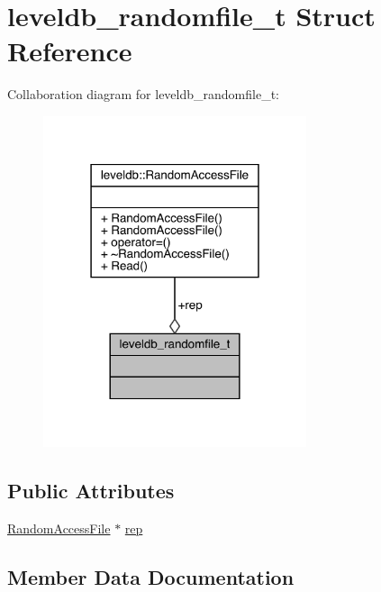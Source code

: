 \hypertarget{structleveldb__randomfile__t}{}\section{leveldb\+\_\+randomfile\+\_\+t Struct Reference}
\label{structleveldb__randomfile__t}


Collaboration diagram for leveldb\+\_\+randomfile\+\_\+t\+:
\nopagebreak
\begin{figure}[H]
\begin{center}
\leavevmode
\includegraphics[width=219pt]{structleveldb__randomfile__t__coll__graph}
\end{center}
\end{figure}
\subsection*{Public Attributes}
\begin{DoxyCompactItemize}
\item 
\mbox{\hyperlink{classleveldb_1_1_random_access_file}{Random\+Access\+File}} $\ast$ \mbox{\hyperlink{structleveldb__randomfile__t_a66667ecc756a0ca312bbc94e2dfc27a5}{rep}}
\end{DoxyCompactItemize}


\subsection{Member Data Documentation}
\mbox{\label{structleveldb__randomfile__t_a66667ecc756a0ca312bbc94e2dfc27a5}} 
